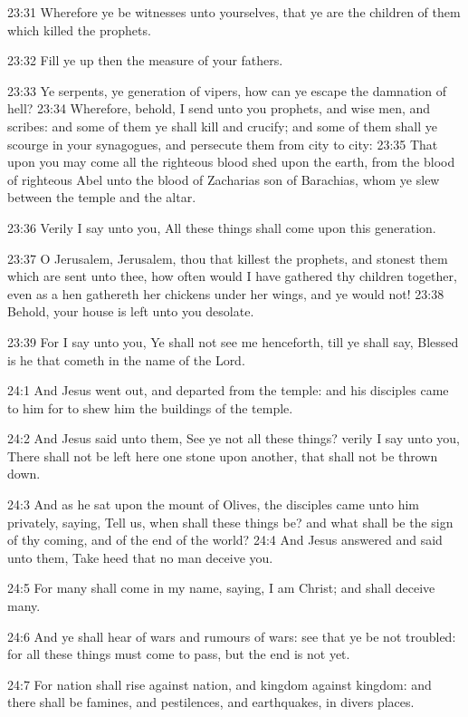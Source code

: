 23:31 Wherefore ye be witnesses unto yourselves, that ye are the children of them which killed the prophets.

23:32 Fill ye up then the measure of your fathers.

23:33 Ye serpents, ye generation of vipers, how can ye escape the damnation of hell?  23:34 Wherefore, behold, I send unto you prophets, and wise men, and scribes: and some of them ye shall kill and crucify; and some of them shall ye scourge in your synagogues, and persecute them from city to city: 23:35 That upon you may come all the righteous blood shed upon the earth, from the blood of righteous Abel unto the blood of Zacharias son of Barachias, whom ye slew between the temple and the altar.

23:36 Verily I say unto you, All these things shall come upon this generation.

23:37 O Jerusalem, Jerusalem, thou that killest the prophets, and stonest them which are sent unto thee, how often would I have gathered thy children together, even as a hen gathereth her chickens under her wings, and ye would not!  23:38 Behold, your house is left unto you desolate.

23:39 For I say unto you, Ye shall not see me henceforth, till ye shall say, Blessed is he that cometh in the name of the Lord.

24:1 And Jesus went out, and departed from the temple: and his disciples came to him for to shew him the buildings of the temple.

24:2 And Jesus said unto them, See ye not all these things? verily I say unto you, There shall not be left here one stone upon another, that shall not be thrown down.

24:3 And as he sat upon the mount of Olives, the disciples came unto him privately, saying, Tell us, when shall these things be? and what shall be the sign of thy coming, and of the end of the world?  24:4 And Jesus answered and said unto them, Take heed that no man deceive you.

24:5 For many shall come in my name, saying, I am Christ; and shall deceive many.

24:6 And ye shall hear of wars and rumours of wars: see that ye be not troubled: for all these things must come to pass, but the end is not yet.

24:7 For nation shall rise against nation, and kingdom against kingdom: and there shall be famines, and pestilences, and earthquakes, in divers places.

